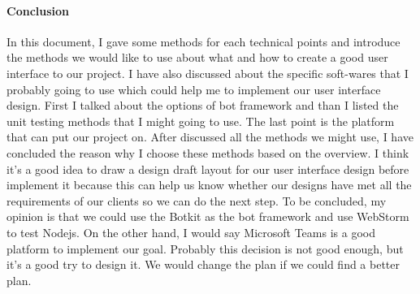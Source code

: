 \paragraph{Conclusion}
In this document, I gave some methods for each technical points and introduce the methods we would like to use about what and how to create a good user interface to our project. I have also discussed about the specific soft-wares that I probably going to use which could help me to implement our user interface design. First I talked about the options of bot framework and than I listed the unit testing methods that I might going to use. The last point is the platform that can put our project on. After discussed all the methods we might use, I have concluded the reason why I choose these methods based on the overview. I think it's a good idea to draw a design draft layout for our user interface design before implement it because this can help us know whether our designs have met all the requirements of our clients so we can do the next step. To be concluded, my opinion is that we could use the Botkit as the bot framework and use WebStorm to test Nodejs. On the other hand, I would say Microsoft Teams is a good platform to implement our goal. Probably this decision is not good enough, but it's a good try to design it. We would change the plan if we could find a better plan.